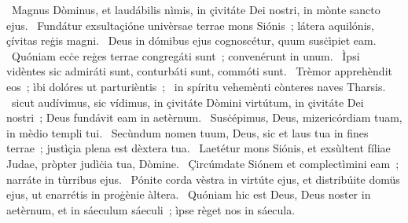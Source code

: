~Magnus Dòminus, et laudábilis nìmis, in çivitáte Dei nostri, in mònte sancto ejus. 
~Fundátur exsultaçióne univèrsae terrae mons Siónis~; látera aquilónis, çívitas reġis magni. 
~Deus in dómibus ejus cognoscétur, quum susċìpiet eam. 
~Quóniam ecċe reġes terrae congregáti sunt~; convenérunt in unum. 
~Ìpsi vidèntes sic admiráti sunt, conturbáti sunt, commóti sunt. 
~Trèmor apprehèndit eos~; ìbi dolóres ut parturièntis~; 
~in spíritu vehemènti cònteres naves Tharsis. 
~sicut audívimus, sic vídimus, in çivitáte Dòmini virtútum, in çivitáte Dei nostri~; Deus fundávit eam in aetèrnum. 
~Susċépimus, Deus, mizericórdiam tuam, in mèdio templi tui. 
~Secùndum nomen tuum, Deus, sic et laus tua in fines terrae~; justìçia plena est dèxtera tua. 
~Laetétur mons Siónis, et exsùltent fíliae Judae, pròpter judìċia tua, Dòmine. 
~Çircúmdate Siónem et complectìmini eam~; narráte in tùrribus ejus. 
~Pónite corda vèstra in virtúte ejus, et distribúite domüs ejus, ut enarrétis in proġènie àltera. 
~Quóniam hic est Deus, Deus noster in aetèrnum, et in sáeculum sáeculi~; ìpse règet nos in sáecula. 
